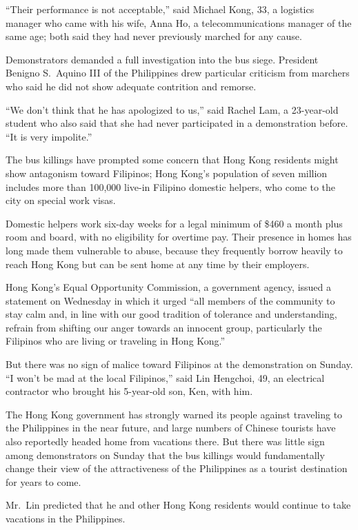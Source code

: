 ﻿\documentclass[12pt]{article}
\begin{document}
``Their performance is not acceptable,'' said Michael Kong, 33, a logistics manager who came with
his wife, Anna Ho, a telecommunications manager of the same age; both said they had never previously
marched for any cause.

Demonstrators demanded a full investigation into the bus siege. President Benigno S.~Aquino III of
the Philippines drew particular criticism from marchers who said he did not show adequate contrition
and remorse.

``We don't think that he has apologized to us,'' said Rachel Lam, a 23-year-old student who also
said that she had never participated in a demonstration before. ``It is very impolite.''

The bus killings have prompted some concern that Hong Kong residents might show antagonism toward
Filipinos; Hong Kong's population of seven million includes more than 100,000 live-in Filipino
domestic helpers, who come to the city on special work visas.

Domestic helpers work six-day weeks for a legal minimum of \$460 a month plus room and board, with
no eligibility for overtime pay. Their presence in homes has long made them vulnerable to abuse,
because they frequently borrow heavily to reach Hong Kong but can be sent home at any time by their
employers.

Hong Kong's Equal Opportunity Commission, a government agency, issued a statement on Wednesday in
which it urged ``all members of the community to stay calm and, in line with our good tradition of
tolerance and understanding, refrain from shifting our anger towards an innocent group, particularly
the Filipinos who are living or traveling in Hong Kong.''

But there was no sign of malice toward Filipinos at the demonstration on Sunday. ``I won't be mad at
the local Filipinos,'' said Lin Hengchoi, 49, an electrical contractor who brought his 5-year-old
son, Ken, with him.

The Hong Kong government has strongly warned its people against traveling to the Philippines in the
near future, and large numbers of Chinese tourists have also reportedly headed home from vacations
there. But there was little sign among demonstrators on Sunday that the bus killings would
fundamentally change their view of the attractiveness of the Philippines as a tourist destination
for years to come.

Mr.~Lin predicted that he and other Hong Kong residents would continue to take vacations in the
Philippines.
\end{document}
